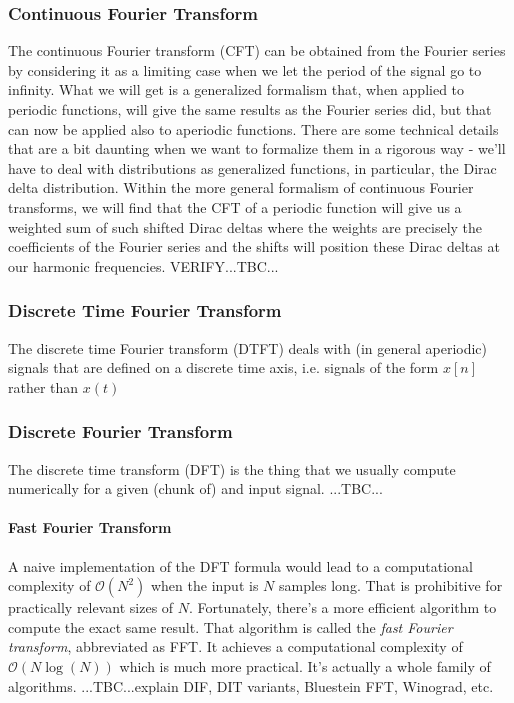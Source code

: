 \subsubsection{Continuous Fourier Transform}
The continuous Fourier transform (CFT) can be obtained from the Fourier series by considering it as a limiting case when we let the period of the signal go to infinity. What we will get is a generalized formalism that, when applied to periodic functions, will give the same results as the Fourier series did, but that can now be applied also to aperiodic functions. There are some technical details that are a bit daunting when we want to formalize them in a rigorous way - we'll have to deal with distributions as generalized functions, in particular, the Dirac delta distribution. Within the more general formalism of continuous Fourier transforms, we will find that the CFT of a periodic function will give us a weighted sum of such shifted Dirac deltas where the weights are precisely the coefficients of the Fourier series and the shifts will position these Dirac deltas at our harmonic frequencies. VERIFY...TBC...




\subsubsection{Discrete Time Fourier Transform}
The discrete time Fourier transform (DTFT) deals with (in general aperiodic) signals that are defined on a discrete time axis, i.e. signals of the form $x[n]$ rather than $x(t)$


\subsubsection{Discrete Fourier Transform}
The discrete time transform (DFT) is the thing that we usually compute numerically for a given (chunk of) and input signal. ...TBC...


\paragraph{Fast Fourier Transform}
A naive implementation of the DFT formula would lead to a computational complexity of $\mathcal{O}(N^2)$ when the input is $N$ samples long. That is prohibitive for practically relevant sizes of $N$. Fortunately, there's a more efficient algorithm to compute the exact same result. That algorithm is called the \emph{fast Fourier transform}, abbreviated as FFT. It achieves a computational complexity of $\mathcal{O}(N \log(N))$ which is much more practical. It's actually a whole family of algorithms. ...TBC...explain DIF, DIT variants, Bluestein FFT, Winograd, etc.

